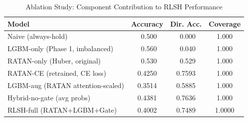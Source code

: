 \begin{table}[ht]
\centering
\caption{Ablation Study: Component Contribution to RLSH Performance}
\label{tab:ablation}
\begin{tabular}{lccc}
\toprule
\textbf{Model} & \textbf{Accuracy} & \textbf{Dir. Acc.} & \textbf{Coverage} \\
\midrule
Naive (always-hold) & ~0.500 & ~0.000 & 1.000 \\
LGBM-only (Phase 1, imbalanced) & ~0.560 & ~0.040 & 1.000 \\
RATAN-only (Huber, original) & ~0.530 & ~0.529 & 1.000 \\
RATAN-CE (retrained, CE loss) & 0.4250 & 0.7593 & 1.000 \\
LGBM-aug (RATAN attention-scaled) & 0.3514 & 0.5885 & 1.000 \\
Hybrid-no-gate (avg probs) & 0.4381 & 0.7636 & 1.000 \\
RLSH-full (RATAN+LGBM+Gate) & 0.4002 & 0.7489 & 1.0000 \\
\bottomrule
\end{tabular}
\end{table}